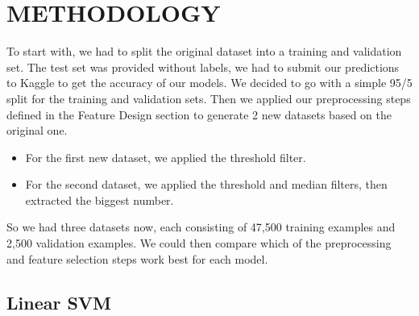 \documentclass[letterpaper, 10 pt, conference]{ieeeconf}  %
\begin{document}
\section{METHODOLOGY}

To start with, we had to split the original dataset into a training and validation set. The test set was provided without labels, we had to submit our predictions to Kaggle to get the accuracy of our models. We decided to go with a simple 95/5 split for the training and validation sets. Then we applied our preprocessing steps defined in the Feature Design section to generate 2 new datasets based on the original one.

\begin{itemize}
\item For the first new dataset, we applied the threshold filter.
\item For the second dataset, we applied the threshold and median filters, then extracted the biggest number.
\end{itemize}

So we had three datasets now, each consisting of 47,500 training examples and 2,500 validation examples. We could then compare which of the preprocessing and feature selection steps work best for each model.

\subsection{Linear SVM}
\end{document}
